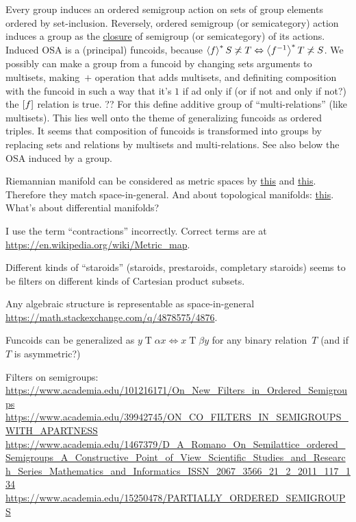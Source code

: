 \documentclass{amsart}
\begin{document}
Every group induces an ordered semigroup action on sets of group elements ordered by set-inclusion.
Reversely, ordered semigroup (or semicategory) action induces a group as the
\href{https://chatgpt.com/share/46122a34-caab-40b9-ba56-5fcba47d23c5}{closure} of semigroup (or semicategory) of its actions.
Induced OSA is a (principal) funcoids, because $\left\langle f\right\rangle ^{\ast}S\not\asymp T\Leftrightarrow \left\langle f^{-1}\right\rangle ^{\ast}T\not\asymp S$.
We possibly can make a group from a funcoid by changing sets arguments to multisets, making~$+$ operation that adds multisets,
and definiting composition with the funcoid in such a way that it's $1$ if ad only if (or if not and only if not?)
the $\mathrel{\left[f\right]}$ relation is true. ?? For this define additive group of ``multi-relations'' (like multisets).
This lies well onto the theme of generalizing funcoids as ordered triples. It seems that composition of funcoids is transformed
into groups by replacing sets and relations by multisets and multi-relations.
See also below the OSA induced by a group.

Riemannian manifold can be considered as metric spaces by
\href{https://mathoverflow.net/q/45154/4086}{this} and \href{https://math.stackexchange.com/q/4962648/4876}{this}.
Therefore they match space-in-general.
And about topological manifolds: \href{https://math.stackexchange.com/q/4963861/4876}{this}.
What's about differential manifolds?

I use the term ``contractions'' incorrectly. Correct terms are at
\url{https://en.wikipedia.org/wiki/Metric_map}.

Different kinds of ``staroids'' (staroids, prestaroids, completary staroids) seems to be filters on
different kinds of Cartesian product subsets.

Any algebraic structure is representable as space-in-general \url{https://math.stackexchange.com/q/4878575/4876}.

Funcoids can be generalized as $y\mathrel{T}\alpha x\Leftrightarrow x\mathrel{T}\beta y$ for any binary relation~$T$
(and if $T$ is asymmetric?)

Filters on semigroups:
\url{https://www.academia.edu/101216171/On_New_Filters_in_Ordered_Semigroups}
\url{https://www.academia.edu/39942745/ON_CO_FILTERS_IN_SEMIGROUPS_WITH_APARTNESS}
\url{https://www.academia.edu/1467379/D_A_Romano_On_Semilattice_ordered_Semigroups_A_Constructive_Point_of_View_Scientific_Studies_and_Research_Series_Mathematics_and_Informatics_ISSN_2067_3566_21_2_2011_117_134}
\url{https://www.academia.edu/15250478/PARTIALLY_ORDERED_SEMIGROUPS}
\end{document}
